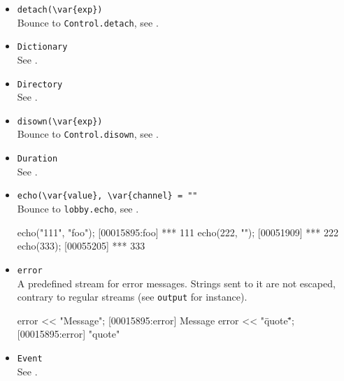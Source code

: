 \begin{itemize}
\item \lstinline|detach(\var{exp})|\\
  Bounce to \lstinline|Control.detach|, see .

\item \lstinline|Dictionary|\\
  See .

\item \lstinline|Directory|\\
  See .

\item \lstinline|disown(\var{exp})|\\
  Bounce to \lstinline|Control.disown|, see .

\item \lstinline|Duration|\\
  See .

\item \lstinline|echo(\var{value}, \var{channel} = ""|\\
  Bounce to \lstinline|lobby.echo|, see .
\begin{urbiscript}
echo("111", "foo");
[00015895:foo] *** 111
echo(222, "");
[00051909] *** 222
echo(333);
[00055205] *** 333
\end{urbiscript}

\item \lstinline|error|\\
  A predefined stream for error messages.  Strings sent to it are not
  escaped, contrary to regular streams (see \lstinline|output| for
  instance).
\begin{urbiscript}
error << "Message";
[00015895:error] Message
error << "\"quote\"";
[00015895:error] "quote"
\end{urbiscript}


\item \lstinline|Event|\\
  See .


\end{itemize}
